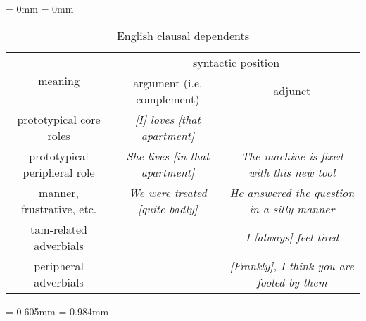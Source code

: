 \documentclass[UTF8, a4paper, oneside, scheme=plain, 12pt]{ctexbook}
\newcommand{\form}[1]{\emph{#1}}
\newcommand{\midsepremove}{\aboverulesep = 0mm \belowrulesep = 0mm}
\newcommand{\midsepdefault}{\aboverulesep = 0.605mm \belowrulesep = 0.984mm}
\begin{document}
\begin{table}[H]
    \caption{English clausal dependents}
    \label{tbl:clausal-dependent}
    \midsepremove
    \centering
    {\footnotesize
    \begin{tabular}{ccc}
    \toprule
    \multirow{2}{*}{meaning}      & \multicolumn{2}{c}{syntactic position}                                                       \\ \cmidrule{2-3}
                                  & argument (i.e. complement)                             & adjunct                                             \\ \midrule
    prototypical core roles       & \cellcolor[HTML]{32CB00}\form{[I] loves [that apartment]}             & \\ 
    prototypical peripheral role  & \cellcolor[HTML]{34FF34}\form{She lives [in that apartment]} & \cellcolor[HTML]{34CDF9}\form{The machine is fixed with this new tool}    \\
    manner, frustrative, etc.     & \cellcolor[HTML]{DAE8FC}\cellcolor[HTML]{67FD9A}\form{We were treated [quite badly]} & \cellcolor[HTML]{DAE8FC}\form{He answered the question in a silly manner} \\
    \cmidrule{1-3}
    \acs{tam}-related adverbials &                                        & \cellcolor[HTML]{ECF4FF}\form{I [always] feel tired}                      \\ \cmidrule{1-3}
    peripheral adverbials  &                                        & \form{[Frankly], I think you are fooled by them} \\ \bottomrule
    \end{tabular}}
    \midsepdefault
\end{table}
\end{document}
